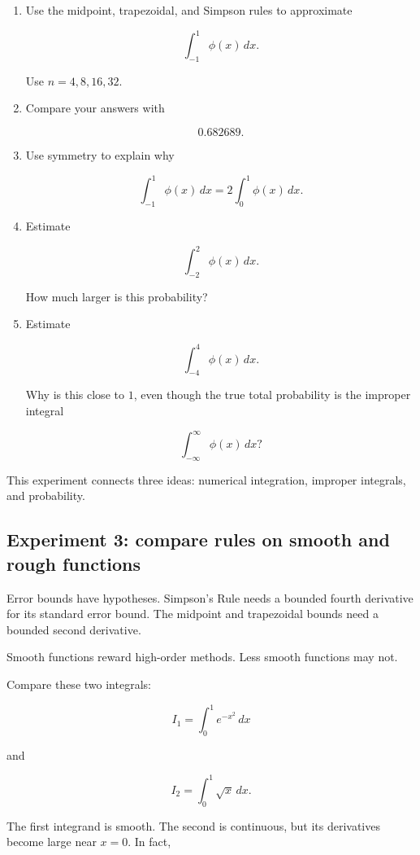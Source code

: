 \begin{enumerate}
\item Use the midpoint, trapezoidal, and Simpson rules to approximate

\[
\int_{-1}^{1}\phi(x)\,dx.
\]

Use \(n=4,8,16,32\).

\item Compare your answers with

\[
0.682689.
\]

\item Use symmetry to explain why

\[
\int_{-1}^{1}\phi(x)\,dx
=
2\int_0^1\phi(x)\,dx.
\]

\item Estimate

\[
\int_{-2}^{2}\phi(x)\,dx.
\]

How much larger is this probability?

\item Estimate

\[
\int_{-4}^{4}\phi(x)\,dx.
\]

Why is this close to \(1\), even though the true total probability is the improper
integral

\[
\int_{-\infty}^{\infty}\phi(x)\,dx?
\]
\end{enumerate}

This experiment connects three ideas: numerical integration, improper integrals, and
probability.

\subsection{Experiment 3: compare rules on smooth and rough functions}
\label{subsec:experiment-smooth-rough}

Error bounds have hypotheses.  Simpson's Rule needs a bounded fourth derivative for
its standard error bound.  The midpoint and trapezoidal bounds need a bounded second
derivative.

Smooth functions reward high-order methods.  Less smooth functions may not.

Compare these two integrals:

\[
I_1=\int_0^1 e^{-x^2}\,dx
\]

and

\[
I_2=\int_0^1 \sqrt{x}\,dx.
\]

The first integrand is smooth.  The second is continuous, but its derivatives become
large near \(x=0\).  In fact,

